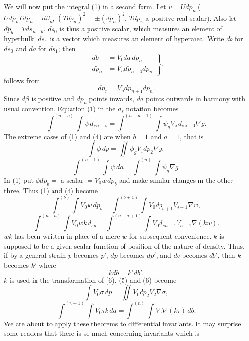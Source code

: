 \documentclass[11pt]{article}
\begin{document}
\indent We will now put the integral (1) in a second form. Let $\breve v=U d\breve p_n$ ($U d\breve p_nT d\breve p_n=d\beta_n$, $(T d\breve p_n)^2=\pm(d\breve p_n)^2$, $T d\breve p_n$ a positive real scalar). Also let $d\breve p_b=\breve vds_{n-b}$. $ds_0$ is thus a positive scalar, which measures an element of hyperbulk. $ds_1$ is a vector which measures an element of hyperarea. Write $db$ for $ds_0$ and $da$ for $ds_1$; then
\begin{equation}\left.\begin{aligned}db&=V_0da\,dp_n\\d\breve p_n&=V_nd\breve p_{n+1}dp_n\end{aligned}\right\}.\tag{3}\end{equation}
follows from
\[dp_n=V_ndp_{n+1}dp_n.\]
Since $d\beta$ is positive and $dp_n$ points inwards, $da$ points outwards in harmony with usual convention. Equation (1) in the $d_s$ notation becomes
\begin{equation}\int^{(n-a)}\!\int\psi\,d_s{}_{n-a}=\int^{(n-a+1)}\!\int\psi_gV_a\,d_s{}_{a-1}\nabla g.\tag{4}\end{equation}
The extreme cases of (1) and (4) are when $b=1$ and $a=1$, that is
\begin{equation}\int\phi\,dp=\iint\phi_gV_1d\breve p_2\nabla g,\tag{5}\end{equation}
\begin{equation}\int^{(n-1)}\!\int\psi\,da=\int^{(n)}\!\int\psi_g\nabla g.\tag{6}\end{equation}
In (1) put $\phi d\breve p_b=$ a scalar $=V_0w\,d\breve p_b$ and make similar changes in the other three. Thus (1) and (4) become
\begin{equation}\int^{(b)}\!\int V_0w\,d\breve p_b=\int^{(b+1)}\!\int V_0d\breve p_{b+1}V_{b+1}\nabla w,\tag{7}\end{equation}
\begin{equation}\int^{(n-a)}\!\int V_0wk\,d_s{}_a=\int^{(n-a+1)}\!\int V_0d_s{}_{a-1}V_{a-1}\nabla(kw).\tag{8}\end{equation}
$wk$ has been written in place of a mere $w$ for subsequent convenience. $k$ is supposed to be a given scalar function of position of the nature of density. Thus, if by a general strain $p$ becomes $p'$, $dp$ becomes $dp'$, and $db$ becomes $db'$, then $k$ becomes $k'$ where
\begin{equation}kdb=k'db'.\tag{9}\end{equation}
$k$ is used in the transformation of (6). (5) and (6) become
\begin{equation}\int V_0\sigma\,dp=\iint V_0d\breve p_2V_2\nabla\sigma,\tag{10}\end{equation}
\begin{equation}\int^{(n-1)}\!\int V_0\tau k\,da=\int^{(n)}\!\int V_0\nabla(k\tau)\,db.\tag{11}\end{equation}
We are about to apply these theorems to differential invariants. It may surprise some readers that there is so much concerning invariants which is
\endgroup
\end{document}
